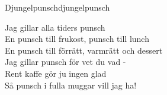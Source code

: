 \begin{song}{Djungelpunsch}{djungelpunsch}
\begin{vers}
Jag gillar alla tiders punsch\\
En punsch till frukost, punsch till lunch\\
En punsch till förrätt, varmrätt och dessert\\
Jag gillar punsch för vet du vad -\\
Rent kaffe gör ju ingen glad\\
Så punsch i fulla muggar vill jag ha!\\
\end{vers}
\end{song}
